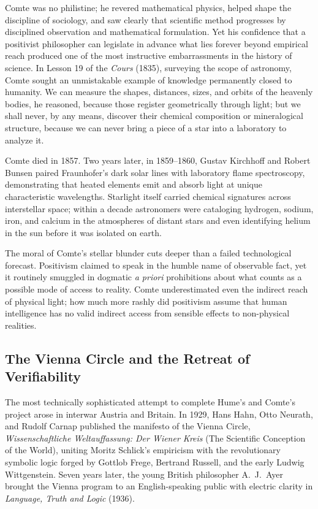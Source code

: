 Comte was no philistine; he revered mathematical physics, helped shape the discipline of sociology, and saw clearly that scientific method progresses by disciplined observation and mathematical formulation. Yet his confidence that a positivist philosopher can legislate in advance what lies forever beyond empirical reach produced one of the most instructive embarrassments in the history of science. In Lesson 19 of the \emph{Cours} (1835), surveying the scope of astronomy, Comte sought an unmistakable example of knowledge permanently closed to humanity. We can measure the shapes, distances, sizes, and orbits of the heavenly bodies, he reasoned, because those register geometrically through light; but we shall never, by any means, discover their chemical composition or mineralogical structure, because we can never bring a piece of a star into a laboratory to analyze it.

Comte died in 1857. Two years later, in 1859--1860, Gustav Kirchhoff and Robert Bunsen paired Fraunhofer's dark solar lines with laboratory flame spectroscopy, demonstrating that heated elements emit and absorb light at unique characteristic wavelengths. Starlight itself carried chemical signatures across interstellar space; within a decade astronomers were cataloging hydrogen, sodium, iron, and calcium in the atmospheres of distant stars and even identifying helium in the sun before it was isolated on earth.

The moral of Comte's stellar blunder cuts deeper than a failed technological forecast. Positivism claimed to speak in the humble name of observable fact, yet it routinely smuggled in dogmatic \emph{a priori} prohibitions about what counts as a possible mode of access to reality. Comte underestimated even the indirect reach of physical light; how much more rashly did positivism assume that human intelligence has no valid indirect access from sensible effects to non-physical realities.

\subsection{The Vienna Circle and the Retreat of Verifiability}

The most technically sophisticated attempt to complete Hume's and Comte's project arose in interwar Austria and Britain. In 1929, Hans Hahn, Otto Neurath, and Rudolf Carnap published the manifesto of the Vienna Circle, \emph{Wissenschaftliche Weltauffassung: Der Wiener Kreis} (The Scientific Conception of the World), uniting Moritz Schlick's empiricism with the revolutionary symbolic logic forged by Gottlob Frege, Bertrand Russell, and the early Ludwig Wittgenstein. Seven years later, the young British philosopher A.\ J.\ Ayer brought the Vienna program to an English-speaking public with electric clarity in \emph{Language, Truth and Logic} (1936).

